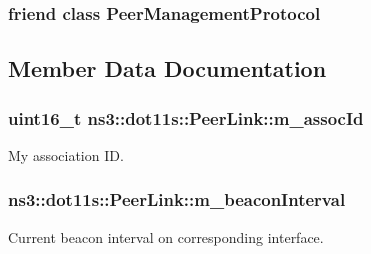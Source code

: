 \subsubsection[{\texorpdfstring{Peer\+Management\+Protocol}{PeerManagementProtocol}}]{\setlength{\rightskip}{0pt plus 5cm}friend class {\bf Peer\+Management\+Protocol}\hspace{0.3cm}{\ttfamily [friend]}}\hypertarget{classns3_1_1dot11s_1_1PeerLink_aad3da9b62656f5a6e24156893dc4e239}{}\label{classns3_1_1dot11s_1_1PeerLink_aad3da9b62656f5a6e24156893dc4e239}


\subsection{Member Data Documentation}
\subsubsection[{\texorpdfstring{m\+\_\+assoc\+Id}{m_assocId}}]{\setlength{\rightskip}{0pt plus 5cm}uint16\+\_\+t ns3\+::dot11s\+::\+Peer\+Link\+::m\+\_\+assoc\+Id\hspace{0.3cm}{\ttfamily [private]}}\hypertarget{classns3_1_1dot11s_1_1PeerLink_af3a64d46026ef508ab62111008ce4084}{}\label{classns3_1_1dot11s_1_1PeerLink_af3a64d46026ef508ab62111008ce4084}


My association ID. 

\subsubsection[{\texorpdfstring{m\+\_\+beacon\+Interval}{m_beaconInterval}}]{ ns3\+::dot11s\+::\+Peer\+Link\+::m\+\_\+beacon\+Interval\hspace{0.3cm}{\ttfamily [private]}}\hypertarget{classns3_1_1dot11s_1_1PeerLink_a859fc614180a0aa59e85a2d50df4dfc1}{}\label{classns3_1_1dot11s_1_1PeerLink_a859fc614180a0aa59e85a2d50df4dfc1}


Current beacon interval on corresponding interface. 

